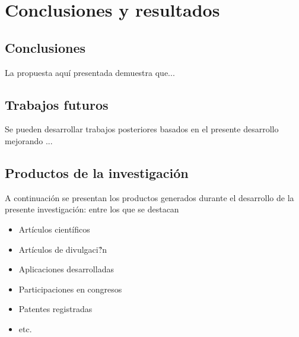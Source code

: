 \chapter{Conclusiones y resultados}
\section{Conclusiones}
La propuesta aqu\'{i} presentada demuestra que...\\

\section{Trabajos futuros}
Se pueden desarrollar trabajos posteriores basados en el presente desarrollo mejorando ...\\


\section{Productos de la investigaci\'{o}n}
A continuaci\'{o}n  se presentan los productos generados durante el desarrollo de la presente investigaci\'{o}n: entre los que se destacan
\begin{itemize}
\item Art\'{i}culos cient\'{i}ficos
\item Art\'{i}culos de divulgaci\'{?}n
\item Aplicaciones desarrolladas
\item Participaciones en congresos
\item Patentes registradas
\item etc.
\end{itemize}



